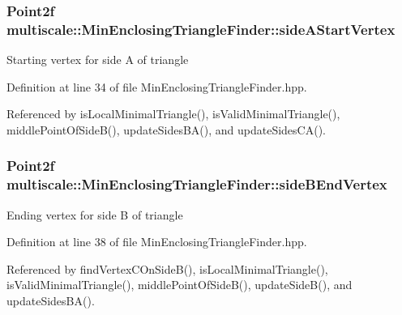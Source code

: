 \hypertarget{classmultiscale_1_1MinEnclosingTriangleFinder_a2e9e3f20e0c0d8bcf34e8ce903aabb42}{
\subsubsection[{side\-A\-Start\-Vertex}]{\setlength{\rightskip}{0pt plus 5cm}\-Point2f {\bf multiscale\-::\-Min\-Enclosing\-Triangle\-Finder\-::side\-A\-Start\-Vertex}}}\label{classmultiscale_1_1MinEnclosingTriangleFinder_a2e9e3f20e0c0d8bcf34e8ce903aabb42}
\-Starting vertex for side \-A of triangle 

\-Definition at line 34 of file \-Min\-Enclosing\-Triangle\-Finder.\-hpp.



\-Referenced by is\-Local\-Minimal\-Triangle(), is\-Valid\-Minimal\-Triangle(), middle\-Point\-Of\-Side\-B(), update\-Sides\-B\-A(), and update\-Sides\-C\-A().

\hypertarget{classmultiscale_1_1MinEnclosingTriangleFinder_a8e3929795823c49572ff65a4f04462c6}{
\subsubsection[{side\-B\-End\-Vertex}]{\setlength{\rightskip}{0pt plus 5cm}\-Point2f {\bf multiscale\-::\-Min\-Enclosing\-Triangle\-Finder\-::side\-B\-End\-Vertex}}}\label{classmultiscale_1_1MinEnclosingTriangleFinder_a8e3929795823c49572ff65a4f04462c6}
\-Ending vertex for side \-B of triangle 

\-Definition at line 38 of file \-Min\-Enclosing\-Triangle\-Finder.\-hpp.



\-Referenced by find\-Vertex\-C\-On\-Side\-B(), is\-Local\-Minimal\-Triangle(), is\-Valid\-Minimal\-Triangle(), middle\-Point\-Of\-Side\-B(), update\-Side\-B(), and update\-Sides\-B\-A().

